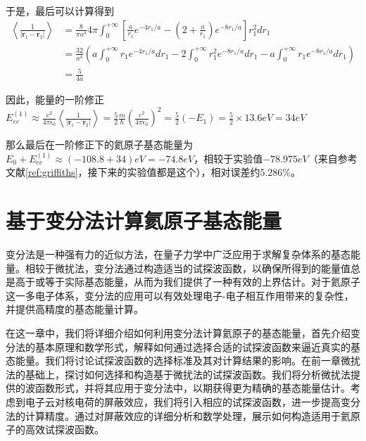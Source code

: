 于是，最后可以计算得到
\begin{equation*}
	\begin{split}
		\left \langle 
		\frac{1}{\left | \textbf{r}_1-\textbf{r}_2 \right | }
		\right \rangle 
		&=
		\frac{8}{\pi a^4}4\pi
		\int_{0}^{+\infty } 
		\left [ 
		\frac{a}{r_1} e^{-4r_1/a} - (2+\frac{a}{r_1}) e^{-8r_1/a}
		\right ] 
		r_1^2 dr_1
		\\
		&=
		\frac{32}{a^4}
		\left ( 
		a\int_{0}^{+\infty}r_1 e^{-4r_1/a} dr_1
		- 
		2\int_{0}^{+\infty} r_1^2 e^{-8r_1/a} dr_1
		- 
		a \int_{0}^{+\infty} r_1 e^{-8r_1/a} dr_1
		\right ) 
		\\
		&=\frac{5}{4a} 
	\end{split}
\end{equation*}

因此，能量的一阶修正$E^{(1)}_{ee}\approx 
\frac{e^2}{4 \pi \epsilon_0 }
\left \langle 
\frac{1}{\left | \textbf{r}_1 -\textbf{r}_2 \right |}
\right \rangle 
=
\frac{5}{2} \frac{m}{\hbar}  \left ( \frac{e^2}{4 \pi \epsilon_0} \right )^2
=\frac{5}{2} \left ( -E_1 \right ) 
= \frac{5}{2} \times  13.6 eV=34eV
$

那么最后在一阶修正下的氦原子基态能量为$E_0 +E^{(1)}_{ee} \approx (-108.8+34) eV=-74.8eV$，相较于实验值$-78.975eV$（来自参考文献\cref{ref:griffiths}，接下来的实验值都是这个），相对误差约$5.286\%$。


\section{基于变分法计算氦原子基态能量}
变分法是一种强有力的近似方法，在量子力学中广泛应用于求解复杂体系的基态能量。相较于微扰法，变分法通过构造适当的试探波函数，以确保所得到的能量值总是高于或等于实际基态能量，从而为我们提供了一种有效的上界估计。对于氦原子这一多电子体系，变分法的应用可以有效处理电子-电子相互作用带来的复杂性，并提供高精度的基态能量计算。

在这一章中，我们将详细介绍如何利用变分法计算氦原子的基态能量，首先介绍变分法的基本原理和数学形式，解释如何通过选择合适的试探波函数来逼近真实的基态能量。我们将讨论试探波函数的选择标准及其对计算结果的影响。在前一章微扰法的基础上，探讨如何选择和构造基于微扰法的试探波函数。我们将分析微扰法提供的波函数形式，并将其应用于变分法中，以期获得更为精确的基态能量估计。考虑到电子云对核电荷的屏蔽效应，我们将引入相应的试探波函数，进一步提高变分法的计算精度。通过对屏蔽效应的详细分析和数学处理，展示如何构造适用于氦原子的高效试探波函数。

